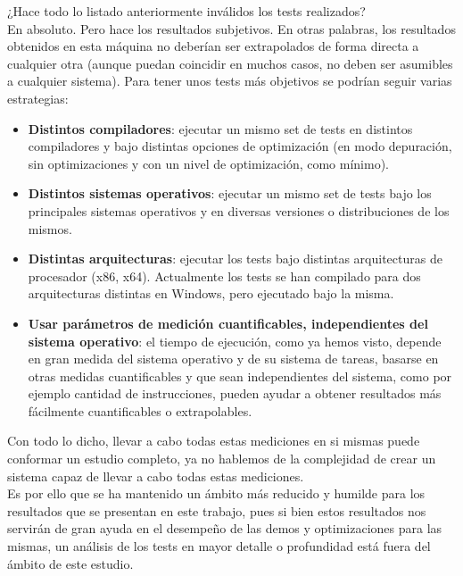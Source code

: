 ¿Hace todo lo listado anteriormente inválidos los tests realizados?\\

En absoluto. Pero hace los resultados subjetivos. En otras palabras, los resultados obtenidos en esta máquina no deberían ser extrapolados de forma directa a cualquier otra (aunque puedan coincidir en muchos casos, no deben ser asumibles a cualquier sistema). Para tener unos tests más objetivos se podrían seguir varias estrategias:

\begin{itemize}
	\item \textbf{Distintos compiladores}: ejecutar un mismo set de tests en distintos compiladores y bajo distintas opciones de optimización (en modo depuración, sin optimizaciones y con un nivel de optimización, como mínimo).
	\item \textbf{Distintos sistemas operativos}: ejecutar un mismo set de tests bajo los principales sistemas operativos y en diversas versiones o distribuciones de los mismos.
	\item \textbf{Distintas arquitecturas}: ejecutar los tests bajo distintas arquitecturas de procesador (x86, x64). Actualmente los tests se han compilado para dos arquitecturas distintas en Windows, pero ejecutado bajo la misma.
	\item \textbf{Usar parámetros de medición cuantificables, independientes del sistema operativo}: el tiempo de ejecución, como ya hemos visto, depende en gran medida del sistema operativo y de su sistema de tareas, basarse en otras medidas cuantificables y que sean independientes del sistema, como por ejemplo cantidad de instrucciones, pueden ayudar a obtener resultados más fácilmente cuantificables o extrapolables.
\end{itemize} 

Con todo lo dicho, llevar a cabo todas estas mediciones en si mismas puede conformar un estudio completo, ya no hablemos de la complejidad de crear un sistema capaz de llevar a cabo todas estas mediciones.\\

Es por ello que se ha mantenido un ámbito más reducido y humilde para los resultados que se presentan en este trabajo, pues si bien estos resultados nos servirán de gran ayuda en el desempeño de las demos y optimizaciones para las mismas, un análisis de los tests en mayor detalle o profundidad está fuera del ámbito de este estudio.